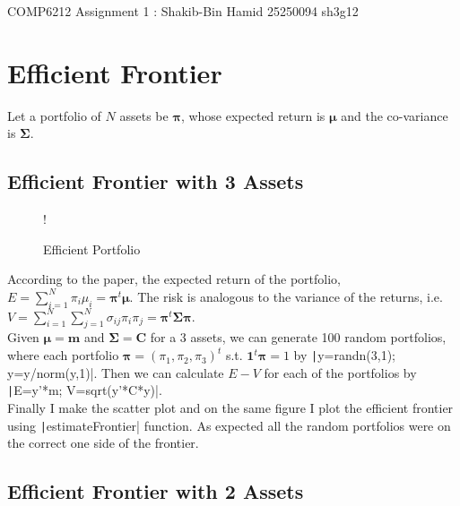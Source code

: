 \documentclass[11pt]{article}
\begin{document}
\begin{center}

\Large{COMP6212 Assignment 1 : Shakib-Bin Hamid 25250094 sh3g12}

\end{center}

\section{Efficient Frontier}

Let a portfolio of $N$ assets be $\bm{\pi}$, whose expected return is $\bm{\mu}$ and the 
co-variance is $\bm{\Sigma}$. \\

\subsection{Efficient Frontier with 3 Assets}

\begin{figure}
	\vspace{-2cm}
  \begin{center}
     {!} { }
	\caption{Efficient Portfolio}
	\label{fig:q1-a-efficient-portfolio}
  \end{center}
	\vspace{-1cm}
\end{figure}

According to the paper, the expected return of the portfolio, 
$E = \sum_{i=1}^N\pi_i\mu_i = \bm{\pi}^t\bm{\mu}$. The risk is analogous to the variance of
the returns, i.e. $V = \sum_{i=1}^N\sum_{j=1}^N\sigma_{ij}\pi_i\pi_j = \bm{\pi}^t\bm{\Sigma}\bm{\pi}$.\\

Given $\bm{\mu} = \bm{m}$ and $\bm{\Sigma} = \bm{C}$ for a $3$ assets, we can generate 100 random
portfolios, where each portfolio $\bm{\pi} = (\pi_1, \pi_2, \pi_3)^t$ s.t. $\bm{1}^t\bm{\pi} = 1$ by
\texttt|y=randn(3,1); y=y/norm(y,1)|. Then we can calculate $E-V$ for each of the portfolios by
\texttt|E=y'*m; V=sqrt(y'*C*y)|.\\

Finally I make the scatter plot and on the same figure I plot the efficient frontier using
\texttt|estimateFrontier| function. As expected all the random portfolios were on the
correct one side of the frontier. 

\subsection{Efficient Frontier with 2 Assets}
\end{document}
